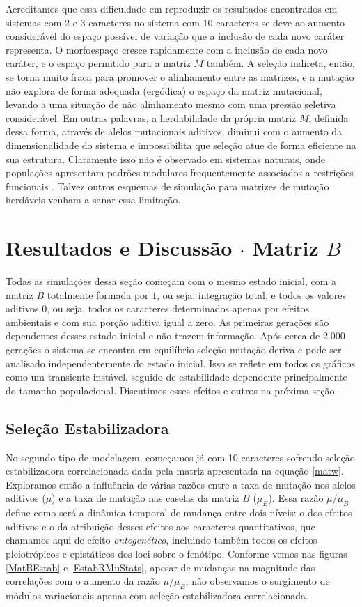 Acreditamos que essa dificuldade em reproduzir os resultados encontrados
em sistemas com 2 e 3 caracteres no sistema com 10 caracteres se deve ao aumento
considerável do espaço possível de variação que a inclusão de cada novo
caráter representa. 
O morfoespaço cresce rapidamente com a inclusão de cada novo caráter, e
o espaço permitido para a matriz $M$ também. 
A seleção indireta, então, se torna muito fraca para promover o
alinhamento entre as matrizes, e a mutação não explora de forma adequada
(ergódica) o espaço da matriz mutacional, levando a uma situação de não alinhamento
mesmo com uma pressão seletiva considerável. 
Em outras palavras, a herdabilidade da própria matriz $M$, definida
dessa forma, através de alelos mutacionais aditivos, diminui com o
aumento da dimensionalidade do sistema e impossibilita que seleção atue
de forma eficiente na sua estrutura.
Claramente isso não é observado em sistemas naturais, onde populações
apresentam padrões modulares frequentemente associados a restrições
funcionais \citep{Porto2009}. 
Talvez outros esquemas de simulação para matrizes de mutação herdáveis
venham a sanar essa limitação.

\section{Resultados e Discussão $\cdot$ Matriz $B$}

Todas as simulações dessa seção começam com o mesmo estado inicial, com
a matriz $B$ totalmente formada por $1$, ou seja, integração total, e
todos os valores aditivos $0$, ou seja, todos os caracteres determinados
apenas por efeitos ambientais e com sua porção aditiva igual a zero. 
As primeiras gerações são dependentes desses estado inicial e não trazem
informação. 
Após cerca de $2.000$ gerações o sistema se encontra em equilíbrio
seleção-mutação-deriva e pode ser analisado independentemente do estado
inicial. 
Isso se reflete em todos os gráficos como um transiente instável, seguido
de estabilidade dependente principalmente do tamanho populacional.
Discutimos esses efeitos e outros na próxima seção. 

\subsection{Seleção Estabilizadora}

No segundo tipo de modelagem, começamos já com 10 caracteres sofrendo
seleção estabilizadora correlacionada dada pela matriz apresentada na
equação \ref{matw}. 
Exploramos então a influência de várias razões entre a taxa de mutação
nos alelos aditivos ($\mu$) e a taxa de mutação nas caselas da matriz
$B$ ($\mu_B$). 
Essa razão $\mu/\mu_B$ define como será a dinâmica temporal de mudança
entre dois níveis: o dos efeitos aditivos e o da atribuição desses
efeitos aos caracteres quantitativos, que chamamos aqui de efeito {\it
ontogenético}, incluindo também todos os efeitos pleiotrópicos e
epistáticos dos loci sobre o fenótipo. 
Conforme vemos nas figuras \ref{MatBEstab} e \ref{EstabRMuStats}, apesar de mudanças na
magnitude das correlações com o aumento da razão $\mu/\mu_B$, não
observamos o surgimento de módulos variacionais apenas com seleção
estabilizadora correlacionada. 


